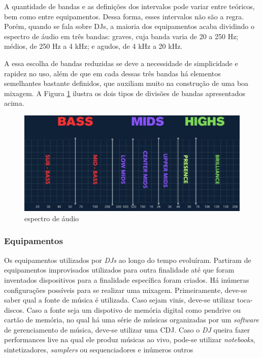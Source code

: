 A quantidade de bandas e as definições dos intervalos pode variar entre teóricos, bem como entre equipamentos. Dessa forma, esses intervalos não são a regra. Porém, quando se fala sobre DJs, a maioria dos equipamentos acaba dividindo o espectro de áudio em três bandas: graves, cuja banda varia de 20 a 250 Hz; médios, de 250 Hz a 4 kHz; e agudos, de 4 kHz a 20 kHz.
\par
A essa escolha de bandas reduzidas se deve a necessidade de simplicidade e rapidez no uso, além de que em cada dessas três bandas há elementos semelhantes bastante definidos, que auxiliam muito na construção de uma boa mixagem. A Figura \ref{fig09} ilustra os dois tipos de divisões de bandas apresentados acima. 

\begin{figure}[h]
	\centering
    \includegraphics[scale=0.4]{figuras/fig09.eps}
	\caption{espectro de áudio \cite{headphonestyAudioFrequency}}
	\label{fig09}
\end{figure}


\subsubsection{Equipamentos}
Os equipamentos utilizados por \textit{DJs} ao longo do tempo evoluíram. Partiram de equipamentos improvisados utilizados para outra finalidade até que foram inventados dispositivos para a finalidade específica foram criados.
Há inúmeras configurações possíveis para se realizar uma mixagem. Primeiramente, deve-se saber qual a fonte de música é utilizada. Caso sejam vinis, deve-se utilizar toca-discos. Caso a fonte seja um dispotivo de memória digital como pendrive ou cartão de memória, no qual há uma série de músicas organizadas por um \textit{software} de gerenciamento de música, deve-se utilizar uma CDJ. Caso o \textit{DJ} queira fazer performances live na qual ele produz músicas ao vivo, pode-se utilizar \textit{notebooks}, sintetizadores, \textit{samplers} ou sequenciadores e inúmeros outros 
